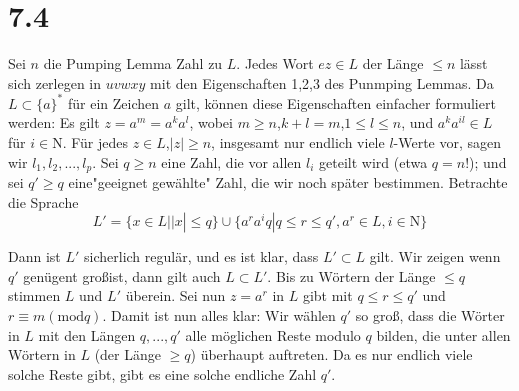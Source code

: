 \documentclass[12pt, a4paper]{article}
\begin{document}
\section*{7.4}
Sei $n$ die Pumping Lemma Zahl zu $L$. Jedes Wort $ez \in L$ der L\"ange $\leq n$ l\"asst sich zerlegen in $uvwxy$ mit den Eigenschaften 1,2,3 des Punmping Lemmas. Da $L \subset \{a\}^*$ f\"ur ein Zeichen $a$ gilt, k\"onnen diese Eigenschaften einfacher formuliert werden:
Es gilt $z= a^m = a^ka^l$, wobei $m \geq n$,$k+l = m$,$ 1 \leq l \leq n$, und $a^ka^{il} \in L$ f\"ur $i \in \mathrm{N}$. F\"ur jedes $z \in L$,$|z| \geq n$, insgesamt nur endlich viele $l$-Werte vor, sagen wir $l_1,l_2,...,l_p$. Sei $q \geq n$ eine Zahl, die vor allen $l_i$ geteilt wird (etwa $q = n!$); und sei $q' \geq q$ eine"geeignet gew\"ahlte" Zahl, die wir noch sp\"ater bestimmen. Betrachte die Sprache
\begin{equation*}
L' = \{ x \in L| |x| \le q\} \cup \{a^ra^iq | q \leq r\leq q' , a^r \in L, i \in \mathrm{N} \}
\end{equation*}

Dann ist $L'$ sicherlich regul\"ar, und es ist klar, dass $L' \subset L$ gilt. Wir zeigen wenn $q'$ gen\"ugent gro\ss ist, dann gilt auch $L \subset L'$. Bis zu W\"ortern der L\"ange $\le q$ stimmen $L$ und $L'$ \"uberein. Sei nun $z = a^r$ in $L$ gibt mit $q \leq r \leq q'$ und $r \equiv m (\text{mod}q)$. Damit ist nun alles klar: Wir w\"ahlen $q'$ so gro\ss, dass die W\"orter in $L$ mit den L\"angen $q,...,q'$ alle m\"oglichen Reste modulo $q$ bilden, die unter allen W\"ortern in $L$ (der L\"ange $\geq q$) \"uberhaupt auftreten. Da es nur endlich viele solche Reste gibt, gibt es eine solche endliche Zahl $q'$.  
 
\end{document}
